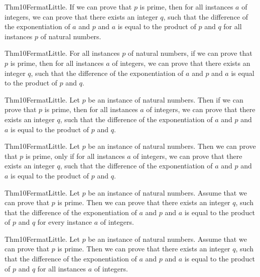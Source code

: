 \documentclass{article}
\begin{document}
Thm10FermatLittle. If we can prove that $p$ is prime, then for all instances $a$ of integers, we can prove that there exists an integer $q$, such that the difference of the exponentiation of $a$ and $p$ and $a$ is equal to the product of $p$ and $q$ for all instances $p$ of natural numbers.

Thm10FermatLittle. For all instances $p$ of natural numbers, if we can prove that $p$ is prime, then for all instances $a$ of integers, we can prove that there exists an integer $q$, such that the difference of the exponentiation of $a$ and $p$ and $a$ is equal to the product of $p$ and $q$.

Thm10FermatLittle. Let $p$ be an instance of natural numbers. Then if we can prove that $p$ is prime, then for all instances $a$ of integers, we can prove that there exists an integer $q$, such that the difference of the exponentiation of $a$ and $p$ and $a$ is equal to the product of $p$ and $q$.

Thm10FermatLittle. Let $p$ be an instance of natural numbers. Then we can prove that $p$ is prime, only if for all instances $a$ of integers, we can prove that there exists an integer $q$, such that the difference of the exponentiation of $a$ and $p$ and $a$ is equal to the product of $p$ and $q$.

Thm10FermatLittle. Let $p$ be an instance of natural numbers. Assume that we can prove that $p$ is prime. Then we can prove that there exists an integer $q$, such that the difference of the exponentiation of $a$ and $p$ and $a$ is equal to the product of $p$ and $q$ for every instance $a$ of integers.

Thm10FermatLittle. Let $p$ be an instance of natural numbers. Assume that we can prove that $p$ is prime. Then we can prove that there exists an integer $q$, such that the difference of the exponentiation of $a$ and $p$ and $a$ is equal to the product of $p$ and $q$ for all instances $a$ of integers.
\end{document}
